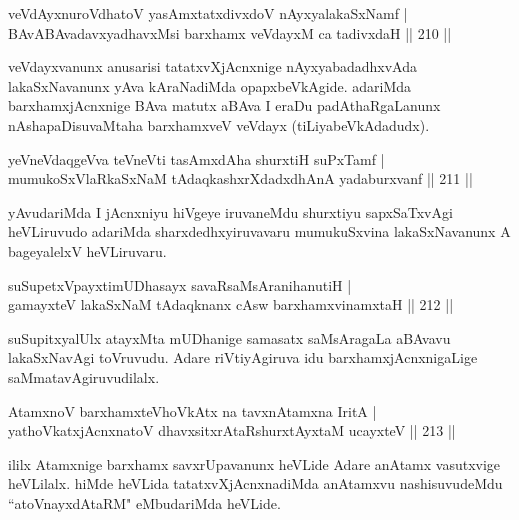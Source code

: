 \begin{shl}
veVdAyxnuroVdhatoV yasAmxtatxdivxdoV nAyxyalakaSxNamf |\\
BAvABAvadavxyadhavxMsi barxhamx veVdayxM ca tadivxdaH \hfill || 210 ||
\end{shl}

\begin{artha}
veVdayxvanunx anusarisi tatatxvXjAcnxnige nAyxyabadadhxvAda lakaSxNavanunx yAva kAraNadiMda opapxbeVkAgide. adariMda barxhamxjAcnxnige BAva matutx aBAva I eraDu padAthaRgaLanunx nAshapaDisuvaMtaha barxhamxveV veVdayx (tiLiyabeVkAdadudx).
\end{artha}

\begin{shl}
yeVneVdaqgeVva teVneVti tasAmxdAha shurxtiH suPxTamf |\\
mumukoSxVlaRkaSxNaM tAdaqkashxrXdadxdhAnA yadaburxvanf \hfill || 211 ||
\end{shl}

\begin{artha}
yAvudariMda I jAcnxniyu hiVgeye iruvaneMdu shurxtiyu sapxSaTxvAgi heVLiruvudo adariMda sharxdedhxyiruvavaru mumukuSxvina lakaSxNavanunx A bageyalelxV heVLiruvaru.
\end{artha}%


\begin{shl}
suSupetxV\s payxtimUDhasayx savaRsaMsAranihanutiH |\\
gamayxteV lakaSxNaM tAdaqknanx cAsw barxhamxvinamxtaH \hfill || 212 ||
\end{shl}

\begin{artha}
suSupitxyalUlx atayxMta mUDhanige samasatx saMsAragaLa aBAvavu lakaSxNavAgi toVruvudu. Adare riVtiyAgiruva idu barxhamxjAcnxnigaLige saMmatavAgiruvudilalx.
\end{artha}


\begin{shl}
AtamxnoV barxhamxteVhoVkAtx na tavxnAtamxna IritA |\\
yathoVkatxjAcnxnatoV dhavxsitxrAtaRshurxtAyx\s taM ucayxteV \hfill || 213 ||
\end{shl}

\begin{artha}
ililx Atamxnige barxhamx savxrUpavanunx heVLide Adare anAtamx vasutxvige heVLilalx. hiMde heVLida tatatxvXjAcnxnadiMda anAtamxvu nashisuvudeMdu ``atoV\s nayxdAtaRM" eMbudariMda heVLide.
\end{artha}

